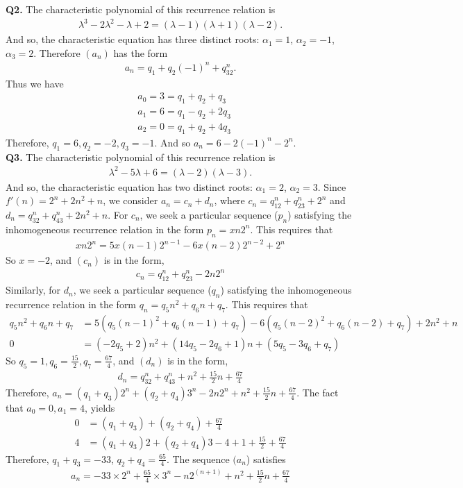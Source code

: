\documentclass{article}[12pt]
\begin{document}
\noindent \textbf{Q2.}
The characteristic polynomial of this recurrence relation is 
\begin{align*}
\lambda^3-2\lambda^2-\lambda+2=(\lambda-1)(\lambda+1)(\lambda-2).
\end{align*}
And so, the characteristic equation has three distinct roots: $\alpha_1=1$, $\alpha_2=-1$, $\alpha_3=2$. Therefore $(a_n)$ has the form
\begin{align*}
a_n=q_1+q_2(-1)^n+q_32^n.
\end{align*}
Thus we have 
\begin{align*}
&a_0=3=q_1+q_2+q_3\\
&a_1=6=q_1-q_2+2q_3\\
&a_2=0=q_1+q_2+4q_3
\end{align*}
Therefore, $q_1=6,q_2=-2,q_3=-1$. And so $a_n=6-2(-1)^n-2^n$.\\ 






\noindent \textbf{Q3.}
The characteristic polynomial of this recurrence relation is 
\begin{align*}
\lambda^2-5\lambda+6=(\lambda-2)(\lambda-3).
\end{align*}
And so, the characteristic equation has two distinct roots: $\alpha_1=2$, $\alpha_2=3$. Since $f'(n)=2^n+2n^2+n$, we consider $a_n=c_n+d_n$, where $c_n=q_12^n+q_23^n+2^n$ and $d_n=q_32^n+q_43^n+2n^2+n$. For $c_n$, we seek a particular sequence ($p_n$) satisfying the inhomogeneous recurrence relation in the form $p_n=xn2^n$. This requires that 
\begin{align*}
xn2^n=5x(n-1)2^{n-1}-6x(n-2)2^{n-2}+2^n
\end{align*}
So $x=-2$, and $(c_n)$ is in the form,
\begin{align*}
c_n=q_12^n+q_23^n-2n2^n
\end{align*}
Similarly, for $d_n$, we seek a particular sequence ($q_n$) satisfying the inhomogeneous recurrence relation in the form $q_n=q_5n^2+q_6n+q_7$. This requires that 
\begin{align*}
q_5n^2+q_6n+q_7&=5(q_5(n-1)^2+q_6(n-1)+q_7)-6(q_5(n-2)^2+q_6(n-2)+q_7)+2n^2+n\\
0&=(-2q_5+2)n^2+(14q_5-2q_6+1)n+(5q_5-3q_6+q_7)
\end{align*}
So $q_5=1,q_6=\frac{15}{2},q_7=\frac{67}{4}$, and $(d_n)$ is in the form,
\begin{align*}
d_n=q_32^n+q_43^n+n^2+\frac{15}{2}n+\frac{67}{4}
\end{align*}
Therefore, $a_n=(q_1+q_3)2^n+(q_2+q_4)3^n-2n2^n+n^2+\frac{15}{2}n+\frac{67}{4}$. The fact that $a_0=0,a_1=4$, yields 
\begin{align*}
0&=(q_1+q_3)+(q_2+q_4)+\frac{67}{4}\\
4&=(q_1+q_3)2+(q_2+q_4)3-4+1+\frac{15}{2}+\frac{67}{4}
\end{align*}
Therefore, $q_1+q_3=-33$, $q_2+q_4=\frac{65}{4}$. The sequence $(a_n$) satisfies
\begin{align*}
a_n=-33\times 2^n+\frac{65}{4}\times 3^n-n2^{(n+1)}+n^2+\frac{15}{2}n+\frac{67}{4}
\end{align*}
\end{document}
